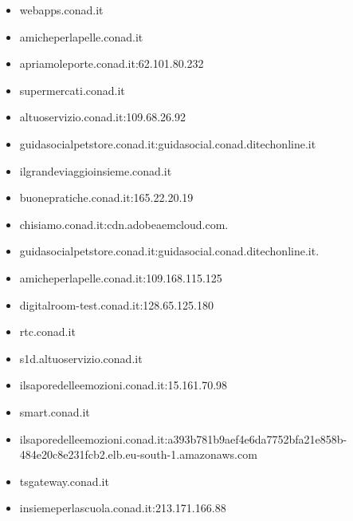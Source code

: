 \documentclass{article}
\begin{document}
\begin{itemize}
        \item webapps.conad.it
    
        \item amicheperlapelle.conad.it
    
        \item apriamoleporte.conad.it:62.101.80.232
    
        \item supermercati.conad.it
    
        \item altuoservizio.conad.it:109.68.26.92
    
        \item guidasocialpetstore.conad.it:guidasocial.conad.ditechonline.it
    
        \item ilgrandeviaggioinsieme.conad.it
    
        \item buonepratiche.conad.it:165.22.20.19
    
        \item chisiamo.conad.it:cdn.adobeaemcloud.com.
    
        \item guidasocialpetstore.conad.it:guidasocial.conad.ditechonline.it.
    
        \item amicheperlapelle.conad.it:109.168.115.125
    
        \item digitalroom-test.conad.it:128.65.125.180
    
        \item rtc.conad.it
    
        \item s1d.altuoservizio.conad.it
    
        \item ilsaporedelleemozioni.conad.it:15.161.70.98
    
        \item smart.conad.it
    
        \item ilsaporedelleemozioni.conad.it:a393b781b9aef4e6da7752bfa21e858b-484e20c8e231fcb2.elb.eu-south-1.amazonaws.com
    
        \item tsgateway.conad.it
    
        \item insiemeperlascuola.conad.it:213.171.166.88
    

\end{itemize}
\end{document}
